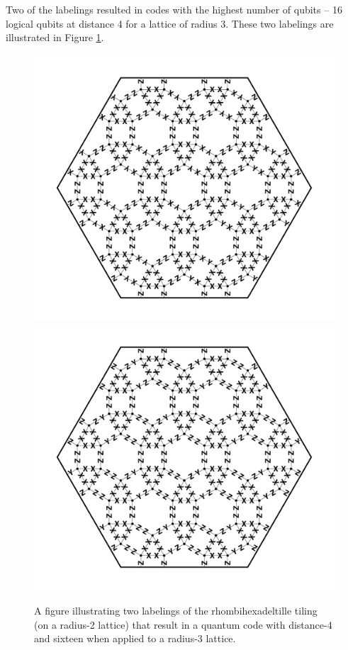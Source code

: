 \documentclass[twocolumn,showpacs,preprintnumbers,amsmath,amssymb,nofootinbib,pra,floatfix]{revtex4-1}
\begin{document}
Two of the labelings resulted in codes with the highest number of qubits -- 16 logical qubits at distance 4 for a lattice of radius 3.  These two labelings are illustrated in Figure \ref{figure:rhombihexadeltille-code-4-labelings}.



\begin{figure}
\includegraphics[width=4.75in]{rhombihexadeltille-code-4-labeling-1} %
\\
\includegraphics[width=4.75in]{rhombihexadeltille-code-4-labeling-2} %
\caption{
\label{figure:rhombihexadeltille-code-4-labelings}
A figure illustrating two labelings of the rhombihexadeltille tiling (on a radius-2 lattice) that result in a quantum code with distance-4 and sixteen when applied to a radius-3 lattice.
}
\end{figure}
\end{document}
